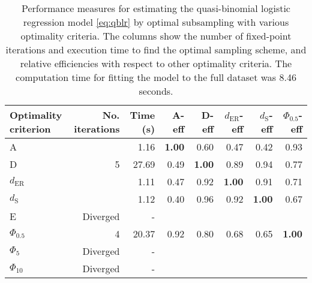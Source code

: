 \begin{table}[htb!]
\centering
\caption{Performance measures for estimating the quasi-binomial logistic regression model \eqref{eq:qblr} by optimal subsampling with various optimality criteria. The columns show the number of fixed-point iterations and execution time to find the optimal sampling scheme, and relative efficiencies with respect to other optimality criteria. The computation time for fitting the model to the full dataset was 8.46 seconds.} 
\label{tab:impact_speed_response_surface}
\begin{tabular}{lrrrrrrr}
 Optimality criterion & No. iterations & Time (s) & A-eff & D-eff & $d_{\mathrm{ER}}$-eff & $d_{\mathrm{S}}$-eff & $\Phi_{0.5}$-eff \\ 
  \hline
A &  & 1.16 & \textbf{1.00} & 0.60 & 0.47 & 0.42 & 0.93 \\ 
  D & 5 & 27.69 & 0.49 & \textbf{1.00} & 0.89 & 0.94 & 0.77 \\ 
  $d_{\mathrm{ER}}$ &  & 1.11 & 0.47 & 0.92 & \textbf{1.00} & 0.91 & 0.71 \\ 
  $d_{\mathrm{S}}$ &  & 1.12 & 0.40 & 0.96 & 0.92 & \textbf{1.00} & 0.67 \\ 
  E & Diverged & - &  &  &  &  &  \\ 
  $\Phi_{0.5}$ & 4 & 20.37 & 0.92 & 0.80 & 0.68 & 0.65 & \textbf{1.00} \\ 
  $\Phi_5$ & Diverged & - &  &  &  &  &  \\ 
  $\Phi_{10}$ & Diverged & - &  &  &  &  &  \\ 
   \hline
\end{tabular}
\end{table}
